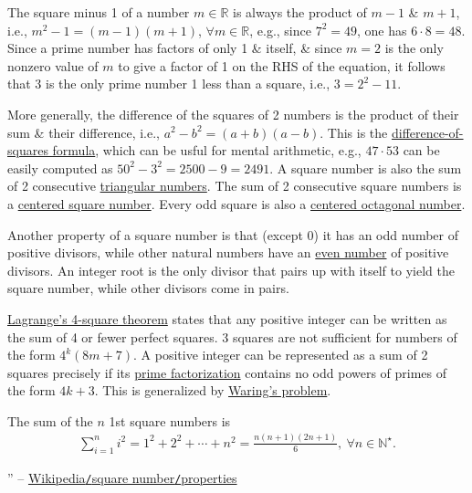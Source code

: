 \documentclass{article}
\begin{document}
The square minus 1 of a number $m\in\mathbb{R}$ is always the product of $m - 1$ \& $m + 1$, i.e., $m^2 - 1 = (m - 1)(m + 1)$, $\forall m\in\mathbb{R}$, e.g., since $7^2 = 49$, one has $6\cdot8 = 48$. Since a prime number has factors of only 1 \& itself, \& since $m = 2$ is the only nonzero value of $m$ to give a factor of 1 on the RHS of the equation, it follows that $3$ is the only prime number 1 less than a square, i.e., $3 = 2^2 - 11$.

More generally, the difference of the squares of 2 numbers is the product of their sum \& their difference, i.e., $a^2 - b^2 = (a + b)(a - b)$. This is the \href{https://en.wikipedia.org/wiki/Difference_of_two_squares}{difference-of-squares formula}, which can be usful for mental arithmetic, e.g., $47\cdot53$ can be easily computed as $50^2 - 3^2 = 2500 - 9 = 2491$. A square number is also the sum of 2 consecutive \href{https://en.wikipedia.org/wiki/Triangular_number}{triangular numbers}. The sum of 2 consecutive square numbers is a \href{https://en.wikipedia.org/wiki/Centered_square_number}{centered square number}. Every odd square is also a \href{https://en.wikipedia.org/wiki/Centered_octagonal_number}{centered octagonal number}.

Another property of a square number is that (except 0) it has an odd number of positive divisors, while other natural numbers have an \href{https://en.wikipedia.org/wiki/Parity_(mathematics)}{even number} of positive divisors. An integer root is the only divisor that pairs up with itself to yield the square number, while other divisors come in pairs.

\href{https://en.wikipedia.org/wiki/Lagrange%27s_four-square_theorem}{Lagrange's 4-square theorem} states that any positive integer can be written as the sum of 4 or fewer perfect squares. 3 squares are not sufficient for numbers of the form $4^k(8m + 7)$. A positive integer can be represented as a sum of 2 squares precisely if its \href{https://en.wikipedia.org/wiki/Prime_factorization}{prime factorization} contains no odd powers of primes of the form $4k + 3$. This is generalized by \href{https://en.wikipedia.org/wiki/Waring%27s_problem}{Waring's problem}.


The sum of the $n$ 1st square numbers is
\begin{align*}
	\boxed{\sum_{i=1}^n i^2 = 1^2 + 2^2 + \cdots + n^2 = \frac{n(n + 1)(2n + 1)}{6},\ \forall n\in\mathbb{N}^\star.}
\end{align*}

'' -- \href{https://en.wikipedia.org/wiki/Square_number#Properties}{Wikipedia{\tt/}square number{\tt/}properties}
\end{document}
